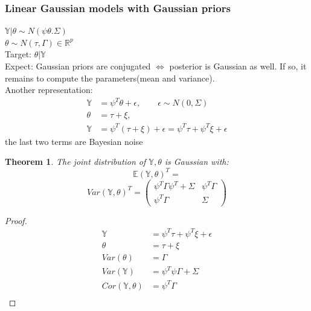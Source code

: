 \documentclass[a4paper,12pt, oneside, fleqn]{book}
\newtheorem{theorem}{Theorem}[section]
\theoremstyle{definition}
\theoremstyle{remark}
\begin{document}
\subsubsection*{Linear Gaussian models with Gaussian priors}

$\mathbb{Y} | \theta \sim N(\psi\theta. \Sigma)$\\
$\theta \sim N(\tau, \Gamma) \in \mathbb{R}^p$\\
Target: $\theta|\mathbb{Y}$\\
Expect: Gaussian priors are conjugated $\Leftrightarrow$ posterior is Gaussian as well. If so, it remains to compute the parameters(mean and variance).\\
Another representation:
\begin{align*}
	\mathbb{Y} &= \psi^T\theta + \epsilon, \qquad \epsilon \sim N(0, \Sigma)\\
	\theta &= \tau + \xi, \\
	\mathbb{Y} &= \psi^T(\tau + \xi) + \epsilon = \psi^T \tau + \psi^T\xi + \epsilon
\end{align*}
the last two terms are Bayesian noise

\begin{theorem}
	The joint distribution of $\mathbb{Y}, \theta$ is Gaussian with:
	\begin{equation*}
		\mathbb{E}(\mathbb{Y}, \theta)^T = 
	\end{equation*}
	\begin{equation*}
		Var(\mathbb{Y}, \theta)^T = 
		\left(\begin{matrix}
			\psi^T \Gamma \psi^T + \Sigma & \psi^T \Gamma  \\
			 \psi^T \Gamma & \Sigma
		\end{matrix}\right)
	\end{equation*}
\end{theorem}

\begin{proof}
	\begin{align*}
		\mathbb{Y} &= \psi^T \tau + \psi^T\xi + \epsilon\\
		\theta &= \tau + \xi\\
		Var(\theta) &= \Gamma \\
		Var(\mathbb{Y}) &= \psi^T \psi \Gamma + \Sigma  \\ 
		Cor(\mathbb{Y}, \theta) &=  \psi^T \Gamma \\
	\end{align*}
\end{proof}
\end{document}
